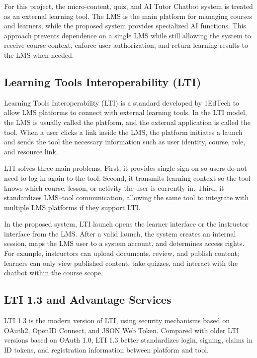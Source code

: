 For this project, the micro-content, quiz, and AI Tutor Chatbot system is
treated as an external learning tool. The LMS is the main platform for
managing courses and learners, while the proposed system provides
specialized AI functions. This approach prevents dependence on a single
LMS while still allowing the system to receive course context, enforce
user authorization, and return learning results to the LMS when needed.

\subsection{Learning Tools Interoperability (LTI)}
\label{subsec:lti}

Learning Tools Interoperability (LTI) is a standard developed by 1EdTech
to allow LMS platforms to connect with external learning tools. In the
LTI model, the LMS is usually called the platform, and the external
application is called the tool. When a user clicks a link inside the LMS,
the platform initiates a launch and sends the tool the necessary
information such as user identity, course, role, and resource link.

LTI solves three main problems. First, it provides single sign-on so users
do not need to log in again to the tool. Second, it transmits learning
context so the tool knows which course, lesson, or activity the user is
currently in. Third, it standardizes LMS--tool communication, allowing the
same tool to integrate with multiple LMS platforms if they support LTI.

In the proposed system, LTI launch opens the learner interface or the
instructor interface from the LMS. After a valid launch, the system
creates an internal session, maps the LMS user to a system account, and
determines access rights. For example, instructors can upload documents,
review, and publish content; learners can only view published content,
take quizzes, and interact with the chatbot within the course scope.

\subsection{LTI 1.3 and Advantage Services}
\label{subsec:lti13-advantage-services}

LTI 1.3 is the modern version of LTI, using security mechanisms based on
OAuth2, OpenID Connect, and JSON Web Token. Compared with older LTI
versions based on OAuth 1.0, LTI 1.3 better standardizes login, signing,
claims in ID tokens, and registration information between platform and
tool.

